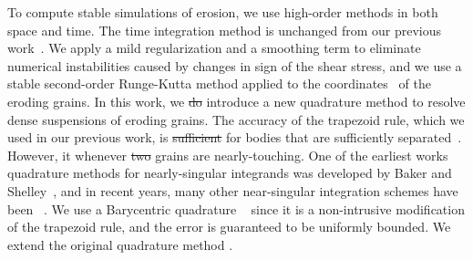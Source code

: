 \documentclass[preprint,10pt]{elsarticle}
\begin{document}
To compute stable simulations of erosion, we use high-order methods in
both space and time. The time integration method is unchanged from our
previous work~\cite{qua-moo2018}.  We apply a mild regularization and a
smoothing term to eliminate numerical instabilities caused by changes in
sign of the shear stress, and we use a stable second-order Runge-Kutta
method applied to the {\thL} coordinates~\cite{hou-low-she1994} of the
eroding grains.  In this work, we \st{do} introduce a new quadrature method
to resolve dense suspensions of eroding grains.  The accuracy of the
trapezoid rule, which we used in our previous work, is \st{sufficient}  for bodies that are sufficiently separated~\cite{tre-wei2014}. 
However, it  whenever \st{two} grains are nearly-touching.  One of the earliest works  quadrature methods for nearly-singular integrands was developed by Baker and Shelley~\cite{bak-she1986}, and in recent years, many other near-singular integration schemes have been ~\cite{oja-tor2015, kli-tor2018, hel-oja2008a, bea-yin-wil2016, bea-lai2001, klo-bar-gre-one2013}.  We use a Barycentric quadrature
~\cite{bar2014, bar-wu-vee2015} since it is a non-intrusive
modification of the trapezoid rule, and the error is guaranteed to be
uniformly bounded.  We extend the original quadrature method .
\end{document}

